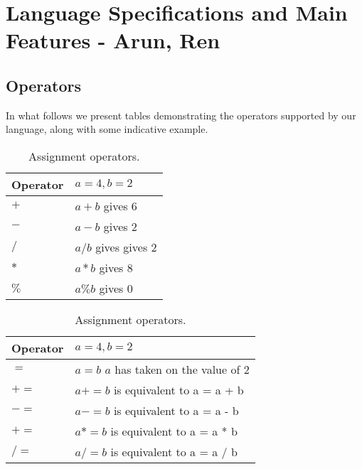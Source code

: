 \section{Language Specifications and Main Features - Arun, Ren}
\label{sect:spec}

\subsection{Operators}
In what follows we present tables demonstrating the operators supported by our 
language, along with some indicative example. 


\begin{table}[h]
\begin{center}
    \parbox{.45\linewidth}{
        \begin{tabular}{| l | l |}
        \hline
        Operator & $a=4, b=2$ \\ \hline
        $+$ &  $a + b$ gives 6 \\  \hline
        $-$ &  $a - b$ gives 2  \\ \hline
        $/$ &  $a / b$ gives gives 2 \\ \hline
        $*$ &  $a * b$ gives 8  \\ \hline
        $\%$ & $a \% b$ gives 0 \\ \hline
        \end{tabular}
        \caption{Arithmetic operators.}
    }
    \parbox{.45\linewidth}{
        \begin{tabular}{| l | l |}
        \hline
        Operator & $a=4, b=2$ \\ \hline
        $=$  &  $a = b$  $a$ has taken on the value of 2 \\ \hline
        $+=$ &  $a += b$ is equivalent to a = a + b\\ \hline
        $-=$ &  $a -= b$ is equivalent to a = a - b \\ \hline
        $+=$ &  $a *= b$ is equivalent to a = a * b\\ \hline
        $/=$ &  $a /= b$ is equivalent to a = a / b\\ \hline
        \end{tabular}
        \caption{Assignment operators.}
    }
\end{center}
\end{table}

